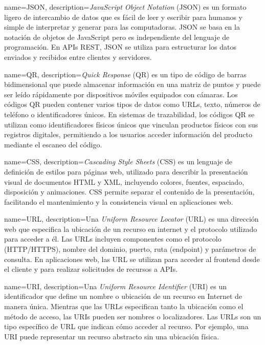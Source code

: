 {
    name=JSON,
    description={\textit{JavaScript Object Notation} (JSON) es un formato ligero de intercambio de datos que es fácil de leer y escribir para humanos y simple de interpretar y generar para las computadoras. JSON se basa en la notación de objetos de JavaScript pero es independiente del lenguaje de programación. En APIs REST, JSON se utiliza para estructurar los datos enviados y recibidos entre clientes y servidores.}
}

{
    name=QR,
    description={\textit{Quick Response} (QR) es un tipo de código de barras bidimensional que puede almacenar información en una matriz de puntos y puede ser leído rápidamente por dispositivos móviles equipados con cámaras. Los códigos QR pueden contener varios tipos de datos como URLs, texto, números de teléfono o identificadores únicos. En sistemas de trazabilidad, los códigos QR se utilizan como identificadores físicos únicos que vinculan productos físicos con sus registros digitales, permitiendo a los usuarios acceder información del producto mediante el escaneo del código.}
}

{
    name=CSS,
    description={\textit{Cascading Style Sheets} (CSS) es un lenguaje de definición de estilos para páginas web, utilizado para describir la presentación visual de documentos HTML y XML, incluyendo colores, fuentes, espaciado, disposición y animaciones. CSS permite separar el contenido de la presentación, facilitando el mantenimiento y la consistencia visual en aplicaciones web.}
}

{
    name=URL,
    description={Una \textit{Uniform Resource Locator} (URL) es una dirección web que especifica la ubicación de un recurso en internet y el protocolo utilizado para acceder a él. Las URLs incluyen componentes como el protocolo (HTTP/HTTPS), nombre del dominio, puerto, ruta (endpoint) y parámetros de consulta. En aplicaciones web, las URL se utilizan para acceder al frontend desde el cliente y para realizar solicitudes de recursos a APIs.}
}

{
    name=URI,
    description={Una \textit{Uniform Resource Identifier} (URI) es un identificador que define un nombre o ubicación de un recurso en Internet de manera única. Mientras que las URLs especifican tanto la ubicación como el método de acceso, las URIs pueden ser nombres o localizadores. Las URLs son un tipo específico de URL que indican cómo acceder al recurso. Por ejemplo, una URI puede representar un recurso abstracto sin una ubicación física.}
}


